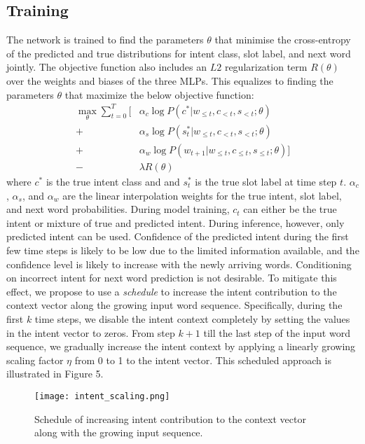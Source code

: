\documentclass[11pt]{article}
\begin{document}
\subsection{Training}
    The network is trained to find the parameters $\theta$ that minimise the cross-entropy of the predicted and true distributions for intent class, slot label, and next word jointly. The objective function also includes an $L2$ regularization term $R(\theta)$ over the weights and biases of the three MLPs. This equalizes to finding the parameters $\theta$ that maximize the below objective function:
        \begin{equation}
            \begin{split}
            \max_{\theta} \sum_{t=0}^{T} \Big[ &\alpha _c \log P(c^*|w_{\leq t}, c_{<t}, s_{<t}; \theta) \\
            + &\alpha _s \log P(s^*_{t}|w_{\leq t}, c_{<t}, s_{<t}; \theta) \\
            + &\alpha _w \log P(w_{t+1}|w_{\leq t}, c_{\leq t}, s_{\leq t}; \theta) \Big] \\
            - & \lambda R(\theta)
            \end{split}
        \end{equation}
    where $c^*$ is the true intent class and and $s^*_{t}$ is the true slot label at time step $t$. $\alpha _c$, $\alpha _s$, and $\alpha _w$ are the linear interpolation weights for the true intent, slot label, and next word probabilities. During model training, $c_t$ can either be the true intent or mixture of true and predicted intent. During inference, however, only predicted intent can be used. Confidence of the predicted intent during the first few time steps is likely to be low due to the limited information available, and the confidence level is likely to increase with the newly arriving words. Conditioning on incorrect intent for next word prediction is not desirable. To mitigate this effect, we propose to use a \textit{schedule} to increase the intent contribution to the context vector along the growing input word sequence. Specifically, during the first $k$ time steps, we disable the intent context completely by setting the values in the intent vector to zeros. From step $k+1$ till the last step of the input word sequence, we gradually increase the intent context by applying a linearly growing scaling factor $\eta$ from 0 to 1 to the intent vector. This scheduled approach is illustrated in Figure 5.
        \begin{figure}[h]
            \centering
            \texttt{[image: intent\_scaling.png]}
            \caption{{Schedule of increasing intent contribution to the context vector along with the growing input sequence.}}
            \label{fig:intent_scaling}
        \end{figure}    
\end{document}
